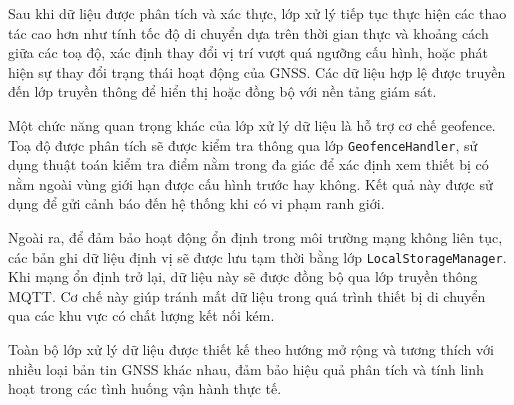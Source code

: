 \documentclass[../DoAn.tex]{subfiles}
\begin{document}
Sau khi dữ liệu được phân tích và xác thực, lớp xử lý tiếp tục thực hiện các thao tác cao hơn như tính tốc độ di chuyển dựa trên thời gian thực và khoảng cách giữa các toạ độ, xác định thay đổi vị trí vượt quá ngưỡng cấu hình, hoặc phát hiện sự thay đổi trạng thái hoạt động của GNSS. Các dữ liệu hợp lệ được truyền đến lớp truyền thông để hiển thị hoặc đồng bộ với nền tảng giám sát.

Một chức năng quan trọng khác của lớp xử lý dữ liệu là hỗ trợ cơ chế geofence. Toạ độ được phân tích sẽ được kiểm tra thông qua lớp \texttt{GeofenceHandler}, sử dụng thuật toán kiểm tra điểm nằm trong đa giác để xác định xem thiết bị có nằm ngoài vùng giới hạn được cấu hình trước hay không. Kết quả này được sử dụng để gửi cảnh báo đến hệ thống khi có vi phạm ranh giới.

Ngoài ra, để đảm bảo hoạt động ổn định trong môi trường mạng không liên tục, các bản ghi dữ liệu định vị sẽ được lưu tạm thời bằng lớp \texttt{LocalStorageManager}. Khi mạng ổn định trở lại, dữ liệu này sẽ được đồng bộ qua lớp truyền thông MQTT. Cơ chế này giúp tránh mất dữ liệu trong quá trình thiết bị di chuyển qua các khu vực có chất lượng kết nối kém.

Toàn bộ lớp xử lý dữ liệu được thiết kế theo hướng mở rộng và tương thích với nhiều loại bản tin GNSS khác nhau, đảm bảo hiệu quả phân tích và tính linh hoạt trong các tình huống vận hành thực tế.
\end{document}
